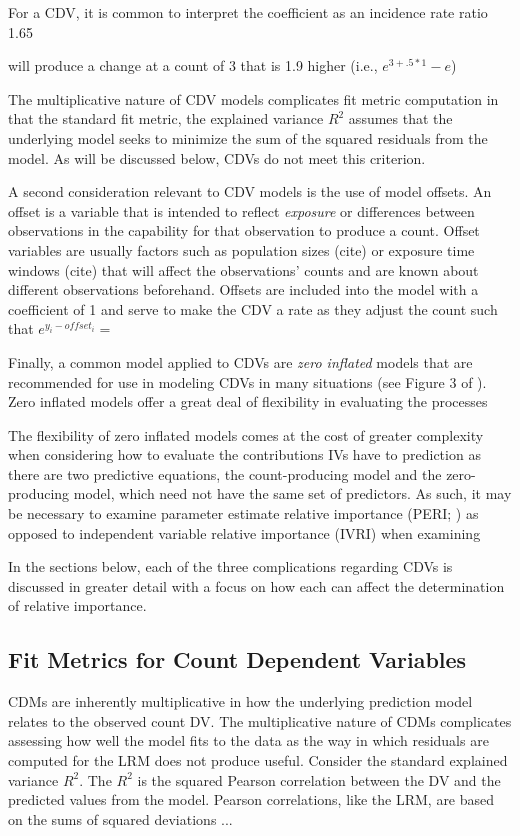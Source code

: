 \documentclass[ShortAfour,times,sageapa]{sagej}
\begin{document}
	For a CDV, it is common to interpret the coefficient as an incidence rate ratio 1.65
	
	will produce a change at a count of 3 that is 1.9 higher (i.e., $e^{3 + .5*1} - e$)
	
	The multiplicative nature of CDV models complicates fit metric computation in that the standard fit metric, the explained variance $R^2$ assumes that the underlying model seeks to minimize the sum of the squared residuals from the model.  As will be discussed below, CDVs do not meet this criterion.
	
	
	A second consideration relevant to CDV models is the use of model offsets.  An offset is a variable that is intended to reflect \emph{exposure} or differences between observations in the capability for that observation to produce a count.  Offset variables are usually factors such as population sizes (cite) or exposure time windows (cite) that will affect the observations' counts and are known about different observations beforehand.  Offsets are included into the model with a coefficient of 1 and serve to make the CDV a rate as they adjust the count such that $e^{y_{i} - offset_{i}} = $
	
	
	Finally, a common model applied to CDVs are \emph{zero inflated} models that are recommended for use in modeling CDVs in many situations (see Figure 3 of \cite{blevins2015count}).  Zero inflated models offer a great deal of flexibility in evaluating the processes
	
	The flexibility of zero inflated models comes at the cost of greater complexity when considering how to evaluate the contributions IVs have to prediction as there are two predictive equations, the count-producing model and the zero-producing model, which need not have the same set of predictors.  As such, it may be necessary to examine parameter estimate relative importance (PERI; \cite{luchman2020relative}) as opposed to independent variable relative importance (IVRI) when examining 
	
	
	In the sections below, each of the three complications regarding CDVs is discussed in greater detail with a focus on how each can affect the determination of relative importance.
		
	
	\subsection{Fit Metrics for Count Dependent Variables}
	
	
	CDMs are inherently multiplicative in how the underlying prediction model relates to the observed count DV. 
	The multiplicative nature of CDMs complicates assessing how well the model fits to the data as the way in which residuals are computed for the LRM does not produce useful.
	Consider the standard explained variance $R^2$.  The $R^2$ is the squared Pearson correlation between the DV and the predicted values from the model. 
	Pearson correlations, like the LRM, are based on the sums of squared deviations ...  
	
\end{document}
